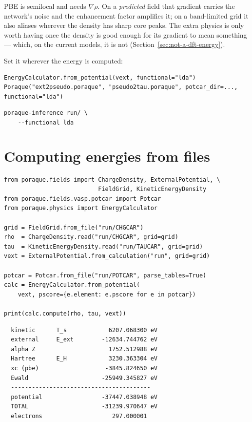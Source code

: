 \begin{pwarn}
PBE is semilocal and needs $\nabla\rho$. On a \emph{predicted} field that
gradient carries the network's noise and the enhancement factor amplifies it;
on a band-limited grid it also aliases wherever the density has sharp core
peaks. The extra physics is only worth having once the density is good enough
for its gradient to mean something --- which, on the current models, it is not
(Section~\ref{sec:not-a-dft-energy}).
\end{pwarn}

Set it wherever the energy is computed:

\begin{lstlisting}
EnergyCalculator.from_potential(vext, functional="lda")
Poraque("ext2pseudo.poraque", "pseudo2tau.poraque", potcar_dir=..., functional="lda")
\end{lstlisting}
\begin{lstlisting}
poraque-inference run/ \
    --functional lda
\end{lstlisting}

\section{Computing energies from files}

\begin{lstlisting}
from poraque.fields import ChargeDensity, ExternalPotential, \
                           FieldGrid, KineticEnergyDensity
from poraque.fields.vasp.potcar import Potcar
from poraque.physics import EnergyCalculator

grid = FieldGrid.from_file("run/CHGCAR")
rho  = ChargeDensity.read("run/CHGCAR", grid=grid)
tau  = KineticEnergyDensity.read("run/TAUCAR", grid=grid)
vext = ExternalPotential.from_calculation("run", grid=grid)

potcar = Potcar.from_file("run/POTCAR", parse_tables=True)
calc = EnergyCalculator.from_potential(
    vext, pscore={e.element: e.pscore for e in potcar})

print(calc.compute(rho, tau, vext))
\end{lstlisting}

\begin{lstlisting}
  kinetic      T_s            6207.068300 eV
  external     E_ext        -12634.744762 eV
  alpha Z                     1752.512988 eV
  Hartree      E_H            3230.363304 eV
  xc (pbe)                   -3845.824650 eV
  Ewald                     -25949.345827 eV
  ----------------------------------------
  potential                 -37447.038948 eV
  TOTAL                     -31239.970647 eV
  electrons                    297.000001
\end{lstlisting}

